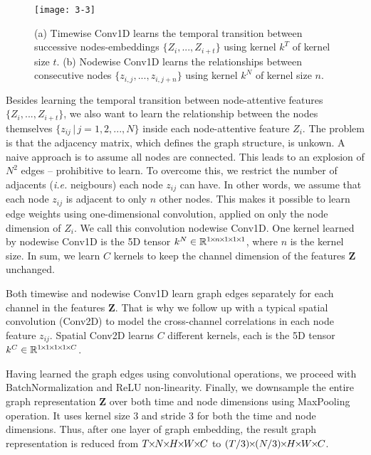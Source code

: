 \documentclass[10pt,twocolumn,letterpaper]{article}
\newcommand{\vbar}{\,|\,}
\begin{document}
\begin{figure}[!ht]
\begin{center}
\texttt{[image: 3-3]}
\end{center}
\caption{(a) Timewise Conv1D learns the temporal transition between successive nodes-embeddings $\{ Z_{i}, ..., Z_{i+t} \}$ using kernel $k^T$ of kernel size $t$.
(b) Nodewise Conv1D learns the relationships between consecutive nodes $\{ z_{i,j}, ..., z_{i,j+n} \}$ using kernel $k^N$ of kernel size $n$.}
\label{fig:3-3}
\end{figure}

Besides learning the temporal transition between node-attentive features $\{Z_{i}, ..., Z_{i+t}\}$, we also want to learn the relationship between the nodes themselves $ \{ z_{ij} \vbar j = 1, 2, ..., N\}$ inside each node-attentive feature $Z_i$.
The problem is that the adjacency matrix, which defines the graph structure, is unkown.
A naive approach is to assume all nodes are connected.
This leads to an explosion of $N^2$ edges -- prohibitive to learn.
To overcome this, we restrict the number of adjacents (\textit{i.e.} neigbours) each node $z_{ij}$ can have.
In other words, we assume that each node $z_{ij}$ is adjacent to only $n$ other nodes.
This makes it possible to learn edge weights using one-dimensional convolution, applied on only the node dimension of $Z_i$.
We call this convolution nodewise Conv1D.
One kernel learned by nodewise Conv1D is the 5D tensor $k^N \in \mathbb{R}^{1 {\mkern-2mu\times\mkern-2mu} n {\mkern-2mu\times\mkern-2mu} 1 {\mkern-2mu\times\mkern-2mu} 1 {\mkern-2mu\times\mkern-2mu} 1}$, where $n$ is the kernel size.
In sum, we learn $C$ kernels to keep the channel dimension of the features $\mathbf{Z}$ unchanged.

Both timewise and nodewise Conv1D learn graph edges separately for each channel in the features $\mathbf{Z}$.
That is why we follow up with a typical spatial convolution (Conv2D) to model the cross-channel correlations in each node feature $z_{ij}$.
Spatial Conv2D learns $C$ different kernels, each is the 5D tensor $k^C \in \mathbb{R}^{1 {\mkern-2mu\times\mkern-2mu} 1 {\mkern-2mu\times\mkern-2mu} 1 {\mkern-2mu\times\mkern-2mu} 1 {\mkern-2mu\times\mkern-2mu} C}$.

Having learned the graph edges using convolutional operations, we proceed with BatchNormalization and ReLU non-linearity.
Finally, we downsample the entire graph representation $\mathbf{Z}$ over both time and node dimensions using MaxPooling operation.
It uses kernel size $3$ and stride $3$ for both the time and node dimensions.
Thus, after one layer of graph embedding, the result graph representation is reduced from $T {\mkern-2mu\times\mkern-2mu} N {\mkern-2mu\times\mkern-2mu} H {\mkern-2mu\times\mkern-2mu} W {\mkern-2mu\times\mkern-2mu} C$ to $ (T/3) {\mkern-2mu\times\mkern-2mu} (N/3) {\mkern-2mu\times\mkern-2mu} H {\mkern-2mu\times\mkern-2mu} W {\mkern-2mu\times\mkern-2mu} C$.
\end{document}

